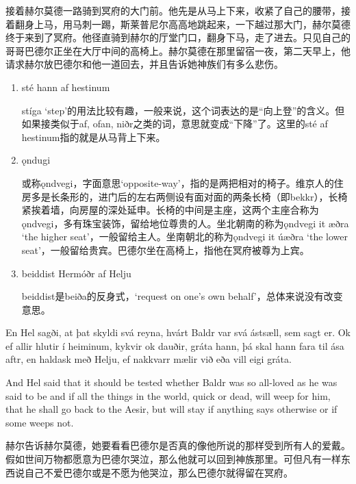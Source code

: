 \begin{translation*}{}
  接着赫尔莫德一路骑到冥府的大门前。他先是从马上下来，收紧了自己的腰带，接着翻身上马，用马刺一踢，斯莱普尼尔高高地跳起来，一下越过那大门，赫尔莫德终于来到了冥府。他径直骑到赫尔的厅堂门口，翻身下马，走了进去。只见自己的哥哥巴德尔正坐在大厅中间的高椅上。赫尔莫德在那里留宿一夜，第二天早上，他请求赫尔放巴德尔和他一道回去，并且告诉她神族们有多么悲伤。
\end{translation*}
\begin{grammar*}{}
  \begin{enumerate}[leftmargin=*]
    \item sté hann af hestinum

          stíga `step'的用法比较有趣，一般来说，这个词表达的是“向上登”的含义。但如果接类似于af, ofan, niðr之类的词，意思就变成“下降”了。这里的sté af hestinum指的就是从马背上下来。

    \item ǫndugi

          或称ǫndvegi，字面意思`opposite-way'，指的是两把相对的椅子。维京人的住房多是长条形的，进门后的左右两侧设有面对面的两条长椅（即bekkr），长椅紧挨着墙，向房屋的深处延申。长椅的中间是主座，这两个主座合称为ǫndvegi，多有珠宝装饰，留给地位尊贵的人。坐北朝南的称为ǫndvegi it æðra `the higher seat'，一般留给主人。坐南朝北的称为ǫndvegi it úæðra `the lower seat'，一般留给贵宾。巴德尔坐在高椅上，指他在冥府被尊为上宾。

    \item beiddist Hermóðr af Helju

          beiddist是beiða的反身式，`request on one's own behalf'，总体来说没有改变意思。
  \end{enumerate}
\end{grammar*}
\begin{paracol}{2}
  En Hel sagði, at þat skyldi svá reyna, hvárt Baldr var svá ástsæll, sem sagt er. Ok ef allir hlutir í heiminum, kykvir ok dauðir, gráta hann, þá skal hann fara til ása aftr, en haldask með Helju, ef nakkvarr mælir við eða vill eigi gráta.

  \switchcolumn

  And Hel said that it should be tested whether Baldr was so all-loved as he was said to be and if all the things in the world, quick or dead, will weep for him, that he shall go back to the Aesir, but will stay if anything says otherwise or if some weeps not.
\end{paracol}
\begin{translation*}{}
  赫尔告诉赫尔莫德，她要看看巴德尔是否真的像他所说的那样受到所有人的爱戴。假如世间万物都愿意为巴德尔哭泣，那么他就可以回到神族那里。可但凡有一样东西说自己不爱巴德尔或是不愿为他哭泣，那么巴德尔就得留在冥府。
\end{translation*}
